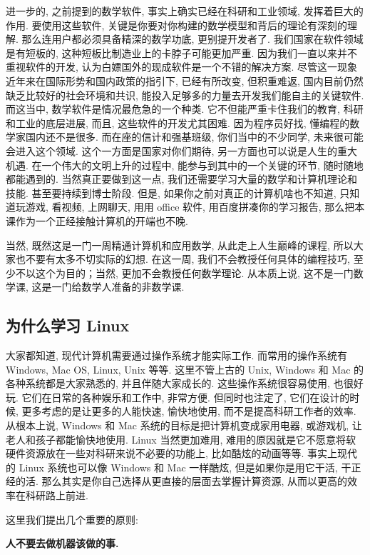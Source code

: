 \documentclass[a4paper]{ctexart}
\begin{document}
进一步的, 之前提到的数学软件, 事实上确实已经在科研和工业领域, 发挥着巨大的作用. 要使用这些软件,
关键是你要对你构建的数学模型和背后的理论有深刻的理解. 那么连用户都必须具备精深的数学功底, 更别提开发者了.
我们国家在软件领域是有短板的, 这种短板比制造业上的卡脖子可能更加严重. 因为我们一直以来并不重视软件的开发,
认为白嫖国外的现成软件是一个不错的解决方案. 尽管这一现象近年来在国际形势和国内政策的指引下, 已经有所改变,
但积重难返, 国内目前仍然缺乏比较好的社会环境和共识, 能投入足够多的力量去开发我们能自主的关键软件. 而这当中,
数学软件是情况最危急的一个种类. 它不但能严重卡住我们的教育, 科研和工业的底层进展, 而且, 这些软件的开发尤其困难.
因为程序员好找, 懂编程的数学家国内还不是很多. 而在座的信计和强基班级, 你们当中的不少同学,
未来很可能会进入这个领域. 这个一方面是国家对你们期待, 另一方面也可以说是人生的重大机遇.
在一个伟大的文明上升的过程中, 能参与到其中的一个关键的环节, 随时随地都能遇到的. 当然真正要做到这一点,
我们还需要学习大量的数学和计算机理论和技能. 甚至要持续到博士阶段. 但是, 如果你之前对真正的计算机啥也不知道,
只知道玩游戏, 看视频, 上网聊天, 用用 office 软件, 用百度拼凑你的学习报告,
那么把本课作为一个正经接触计算机的开端也不晚.

当然, 既然这是一门一周精通计算机和应用数学, 从此走上人生巅峰的课程, 所以大家也不要有太多不切实际的幻想.
在这一周, 我们不会教授任何具体的编程技巧, 至少不以这个为目的；当然, 更加不会教授任何数学理论. 从本质上说,
这不是一门数学课, 这是一门给数学人准备的非数学课. 

\subsection{为什么学习 Linux}
大家都知道, 现代计算机需要通过操作系统才能实际工作. 而常用的操作系统有 Windows, Mac OS, Linux, Unix 等等.
这里不管上古的 Unix, Windows 和 Mac 的各种系统都是大家熟悉的, 并且伴随大家成长的. 这些操作系统很容易使用,
也很好玩. 它们在日常的各种娱乐和工作中, 非常方便. 但同时也注定了, 它们在设计的时候, 更多考虑的是让更多的人能快速,
愉快地使用, 而不是提高科研工作者的效率. 从根本上说, Windows 和 Mac 系统的目标是把计算机变成家用电器, 或游戏机, 
让老人和孩子都能愉快地使用. Linux 当然更加难用, 难用的原因就是它不愿意将软硬件资源放在一些对科研来说不必要的功能上,
比如酷炫的动画等等. 事实上现代的 Linux 系统也可以像 Windows 和 Mac 一样酷炫, 但是如果你是用它干活, 干正经的活.
那么其实是你自己选择从更直接的层面去掌握计算资源, 从而以更高的效率在科研路上前进. 

这里我们提出几个重要的原则:

{\bf 人不要去做机器该做的事.}
\end{document}
